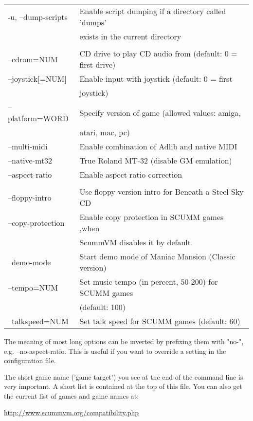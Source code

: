 \begin{tabular}{ll}
  -u, --dump-scripts      &Enable script dumping if a directory called 'dumps'\\
                          &exists in the current directory\\
\\
  --cdrom=NUM             &CD drive to play CD audio from (default: 0 = first drive)\\
  --joystick[=NUM]        &Enable input with joystick (default: 0 = first\\
                          &joystick)\\
  --platform=WORD         &Specify version of game (allowed values: amiga,\\
                          &atari, mac, pc)\\
  --multi-midi            &Enable combination of Adlib and native MIDI\\
  --native-mt32           &True Roland MT-32 (disable GM emulation)\\
  --aspect-ratio          &Enable aspect ratio correction\\
\\
  --floppy-intro          &Use floppy version intro for Beneath a Steel Sky CD\\
  --copy-protection       &Enable copy protection in SCUMM games ,when\\
                          &ScummVM disables it by default.\\
  --demo-mode             &Start demo mode of Maniac Mansion (Classic version)\\
  --tempo=NUM             &Set music tempo (in percent, 50-200) for SCUMM games\\
                          &(default: 100)\\
  --talkspeed=NUM         &Set talk speed for SCUMM games (default: 60)\\
\end{tabular}

The meaning of most long options can be inverted by prefixing them with "no-",
e.g. --no-aspect-ratio. This is useful if you want to override a setting in the
configuration file.

The short game name ('game target') you see at the end of the command
line is very important. A short list is contained at the top of this
file. You can also get the current list of games and game names at:

\begin{center}
  \url{http://www.scummvm.org/compatibility.php}
\end{center}

